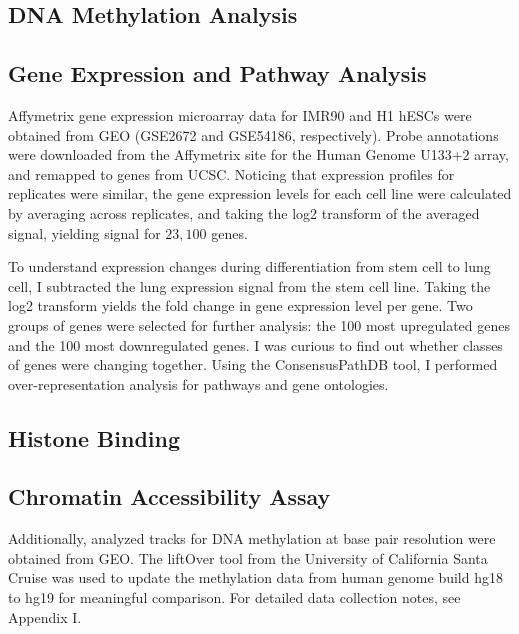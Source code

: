 \documentclass[phd,tocprelim]{cornell}
\begin{document}
\subsection{DNA Methylation Analysis}


\subsection{Gene Expression and Pathway Analysis}

Affymetrix gene expression microarray data for IMR90 and H1 hESCs were obtained from GEO (GSE2672\cite{kim2005}
and GSE54186\cite{kim2014}, respectively).  Probe annotations were downloaded from the Affymetrix site for
the Human Genome U133+2 array, and remapped to genes from UCSC.  Noticing that expression profiles for replicates
were similar, the gene expression levels for each cell line were calculated by averaging across replicates, and
taking the log2 transform of the averaged signal, yielding signal for $23,100$ genes.


To understand expression changes during differentiation from stem cell to lung cell, I subtracted the lung expression
signal from the stem cell line.  Taking the log2 transform yields the fold change in gene expression level per gene.
Two groups of genes were selected for further analysis: the 100 most upregulated genes and the 100 most downregulated
genes.  I was curious to find out whether classes of genes were changing together.  Using the ConsensusPathDB
tool\cite{kamburov2012}, I performed over-representation analysis for pathways and gene ontologies.

\subsection{Histone Binding}


\subsection{Chromatin Accessibility Assay}


Additionally, analyzed tracks for DNA methylation at base pair
resolution were obtained from GEO\cite{lister2009}.  The liftOver tool from
the University of California Santa Cruise was used to update the methylation
data from human genome build hg18 to hg19 for meaningful comparison\cite{hinrichs2006}.
For detailed data collection notes, see Appendix I.
\end{document}
